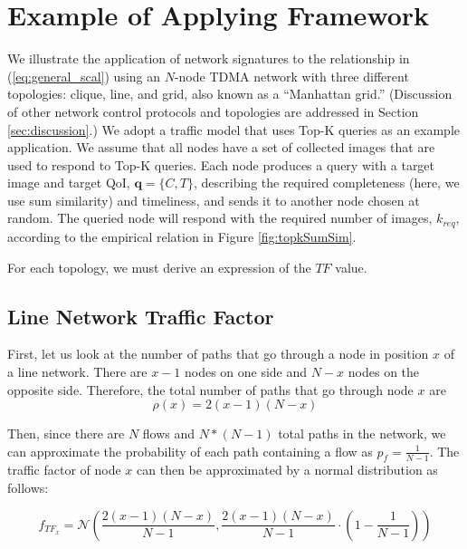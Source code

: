 \section{Example of Applying Framework}
\label{sec:example_applications}

We illustrate the application of network signatures to the relationship in (\ref{eq:general_scal}) using an $N$-node TDMA network with three different topologies: clique, line, and grid, also known as a ``Manhattan grid.''  (Discussion of other network control protocols and topologies are addressed in Section \ref{sec:discussion}.)  We adopt a traffic model that uses Top-K queries as an example application.  We assume that all nodes have a set of collected images that are used to respond to Top-K queries.  Each node produces a query with a target image and target QoI, $\mathbf{q} = \{C, T\}$, describing the required completeness (here, we use sum similarity) and timeliness, and sends it to another node chosen at random.  The queried node will respond with the required number of images, $k_{req}$, according to the empirical relation in Figure \ref{fig:topkSumSim}.

For each topology, we must derive an expression of the $TF$ value.
\subsection{Line Network Traffic Factor}

First, let us look at the number of paths that go through a node in position $x$ of a line network.  There are $x-1$ nodes on one side and $N-x$ nodes on the opposite side.  Therefore, the total number of paths that go through node $x$ are
\begin{equation*}
	\rho(x) = 2(x-1)(N-x)
\end{equation*}

Then, since there are $N$ flows and $N*(N-1)$ total paths in the network, we can approximate the probability of each path containing a flow as $p_f = \frac{1}{N-1}$.  The traffic factor of node $x$ can then be approximated by a normal distribution as follows:

\begin{equation*}
	f_{TF_x} = \mathcal{N}( \frac{2(x-1)(N-x)}{N-1}, \frac{2(x-1)(N-x)}{N-1} \cdot ( 1 - \frac{1}{N-1} )  )
\end{equation*}

